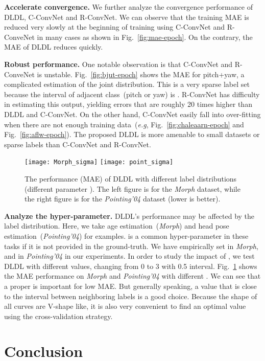 \documentclass[journal]{IEEEtran}
\begin{document}
\textbf{Accelerate convergence.}
 We further analyze the convergence performance of DLDL, C-ConvNet and R-ConvNet. We can observe that the training MAE is reduced very slowly at the beginning of training using C-ConvNet and R-ConveNet in many cases as shown in Fig.~\ref{fig:mae-epoch}. On the contrary, the MAE of DLDL reduces quickly.

\textbf{Robust performance.}
 One notable observation is that C-ConvNet and R-ConveNet is unstable. Fig.~\ref{fig:bjut-epoch} shows the MAE for pitch+yaw, a complicated estimation of the joint distribution. This is a very sparse label set because the interval of adjacent class~(pitch or yaw) is . R-ConvNet has difficulty in estimating this output, yielding errors that are roughly 20 times higher than DLDL and C-ConvNet. On the other hand, C-ConvNet easily fall into over-fitting when there are not enough training data~(\emph{e.g}, Fig.~\ref{fig:chaleaarn-epoch} and Fig.~\ref{fig:aflw-epoch}). The proposed DLDL is more amenable to small datasets or sparse labels than C-ConvNet and R-ConvNet.

\begin{figure}
	\centering
	\texttt{[image: Morph\_sigma]}
	\texttt{[image: point\_sigma]}
	\caption{The performance (MAE) of DLDL with different label distributions (different parameter ). The left figure is for the \emph{Morph} dataset, while the right figure is for the \emph{Pointing'04} dataset (lower is better).}
	\label{fig:pa}
\end{figure}


\textbf{Analyze the hyper-parameter.}
DLDL's performance may be affected by the label distribution. Here, we take age estimation~(\emph{Morph}) and head pose estimation~(\emph{Pointing'04}) for examples.  is a common hyper-parameter in these tasks if it is not provided in the ground-truth. We have empirically set  in \emph{Morph}, and  in \emph{Pointing'04} in our experiments. In order to study the impact of , we test DLDL with different  values, changing from 0 to 3 with 0.5 interval. Fig.~\ref{fig:pa} shows the MAE performance on \emph{Morph} and \emph{Pointing'04} with different . We can see that a proper  is important for low MAE. But generally speaking, a  value that is close to the interval between neighboring labels is a good choice. Because the shape of all curves are V-shape like, it is also very convenient to find an optimal  value using the cross-validation strategy.

\section{Conclusion}\label{sec:co}
\end{document}
